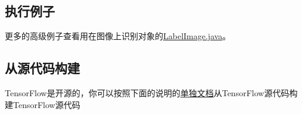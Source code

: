 \subsection{执行例子}
更多的高级例子查看用在图像上识别对象的\href{https://www.github.com/tensorflow/tensorflow/blob/r1.4/tensorflow/java/src/main/java/org/tensorflow/examples/LabelImage.java}{LabelImage.java}。
\subsection{从源代码构建}
TensorFlow是开源的，你可以按照下面的说明的\href{https://github.com/tensorflow/tensorflow/blob/master/tensorflow/java/README.md}{单独文档}从TensorFlow源代码构建TensorFlow源代码
